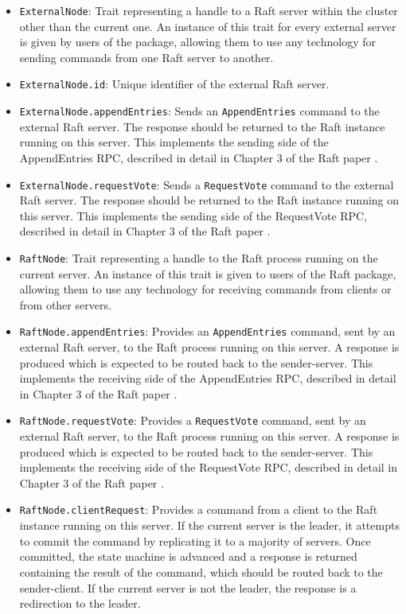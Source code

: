 \begin{itemize}
    \item \lstinline|ExternalNode|: Trait representing a handle to a Raft server within the cluster other than the current one. An instance of this trait for every external server is given by users of the package, allowing them to use any technology for sending commands from one Raft server to another.
    \item \lstinline|ExternalNode.id|: Unique identifier of the external Raft server.
    \item \lstinline|ExternalNode.appendEntries|: Sends an \lstinline|AppendEntries| command to the external Raft server. The response should be returned to the Raft instance running on this server. This implements the sending side of the AppendEntries RPC, described in detail in Chapter 3 of the Raft paper \cite{raft}.
    \item \lstinline|ExternalNode.requestVote|: Sends a \lstinline|RequestVote| command to the external Raft server. The response should be returned to the Raft instance running on this server. This implements the sending side of the RequestVote RPC, described in detail in Chapter 3 of the Raft paper \cite{raft}.
    \item \lstinline|RaftNode|: Trait representing a handle to the Raft process running on the current server. An instance of this trait is given to users of the Raft package, allowing them to use any technology for receiving commands from clients or from other servers.
    \item \lstinline|RaftNode.appendEntries|: Provides an \lstinline|AppendEntries| command, sent by an external Raft server, to the Raft process running on this server. A response is produced which is expected to be routed back to the sender-server. This implements the receiving side of the AppendEntries RPC, described in detail in Chapter 3 of the Raft paper \cite{raft}.
    \item \lstinline|RaftNode.requestVote|: Provides a \lstinline|RequestVote| command, sent by an external Raft server, to the Raft process running on this server. A response is produced which is expected to be routed back to the sender-server. This implements the receiving side of the RequestVote RPC, described in detail in Chapter 3 of the Raft paper \cite{raft}.
    \item \lstinline|RaftNode.clientRequest|: Provides a command from a client to the Raft instance running on this server. If the current server is the leader, it attempts to commit the command by replicating it to a majority of servers. Once committed, the state machine is advanced and a response is returned containing the result of the command, which should be routed back to the sender-client. If the current server is not the leader, the response is a redirection to the leader.

\end{itemize}
